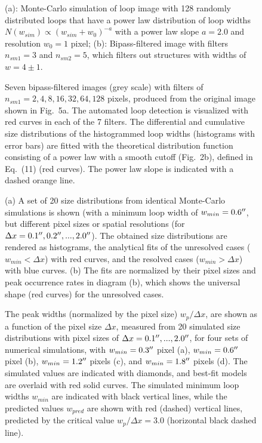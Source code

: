 \documentclass[10pt,preprint]{aastex}  %
\def\arcsec{\hbox{$^{\prime\prime}$}}
\begin{document}
\begin{figure}
\caption{(a): Monte-Carlo simulation of loop image with 
128 randomly distributed loops that have a power law distribution 
of loop widths $N(w_{sim}) \propto (w_{sim}+w_0)^{-a}$ with a 
power law slope $a=2.0$ and resolution $w_0=1$ pixel;
(b): Bipass-filtered image with filters $n_{sm1}=3$ and
$n_{sm2}=5$, which filters out structures with widths of 
$w = 4 \pm 1$.}
\end{figure}

\begin{figure}
\caption{Seven bipass-filtered images (grey scale) with filters of
$n_{sm1}=2, 4, 8, 16, 32, 64, 128$ pixels, produced from the original
image shown in Fig.~5a. The automated loop detection is visualized
with red curves in each of the 7 filters. The differential and
cumulative size distributions of the histogrammed loop widths
(histograms with error bars) are fitted with the theoretical
distribution function consisting of a power law with a smooth
cutoff (Fig.~2b), defined in Eq.~(11) (red curves). The power law
slope is indicated with a dashed orange line.}
\end{figure}

\begin{figure}
\caption{(a) A set of 20 size distributions from identical Monte-Carlo 
simulations is shown (with a minimum loop width of $w_{min}=0.6\arcsec$,
but different pixel sizes or spatial resolutions (for
$\Delta x=0.1\arcsec, 0.2\arcsec, ..., 2.0\arcsec$).  
The obtained size distributions are 
rendered as histograms, the analytical fits of the unresolved cases 
($w_{min} < \Delta x$) with red curves, and the resolved cases
($w_{min} > \Delta x$) with blue curves. (b) The fits are normalized 
by their pixel sizes and peak occurrence rates in diagram (b), 
which shows the universal shape (red curves) for the unresolved cases.}
\end{figure}

\begin{figure}
\caption{The peak widths (normalized by the pixel size) $w_p/\Delta x$, 
are shown as a function of the pixel size $\Delta x$, 
measured from 20 simulated size distributions with pixel sizes of 
$\Delta x=0.1\arcsec,...,2.0\arcsec$, for four sets of numerical
simulations, with 
$w_{min}=0.3\arcsec$ pixel (a), 
$w_{min}=0.6\arcsec$ pixel (b), 
$w_{min}=1.2\arcsec$ pixels (c), and 
$w_{min}=1.8\arcsec$ pixels (d). The simulated values are indicated
with diamonds, and best-fit models are overlaid with red solid curves. 
The simulated minimum loop widths $w_{min}$ are indicated with black 
vertical lines, while the predicted values $w_{pred}$ are shown with 
red (dashed) vertical lines, predicted by the critical value 
$w_p/\Delta x = 3.0$ (horizontal black dashed line).}
\end{figure}
\end{document}
